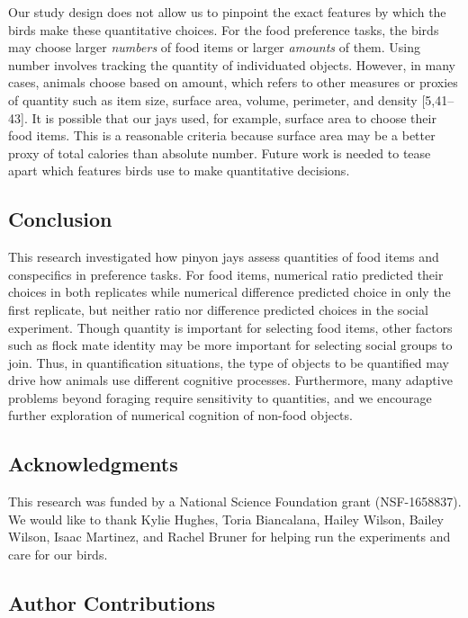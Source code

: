 \documentclass[
  ,pub,floatsintext]{apa6}
\begin{document}
Our study design does not allow us to pinpoint the exact features by which the birds make these quantitative choices. For the food preference tasks, the birds may choose larger \emph{numbers} of food items or larger \emph{amounts} of them. Using number involves tracking the quantity of individuated objects. However, in many cases, animals choose based on amount, which refers to other measures or proxies of quantity such as item size, surface area, volume, perimeter, and density {[}5,41--43{]}. It is possible that our jays used, for example, surface area to choose their food items. This is a reasonable criteria because surface area may be a better proxy of total calories than absolute number. Future work is needed to tease apart which features birds use to make quantitative decisions.

\hypertarget{conclusion}{%
\subsection{Conclusion}\label{conclusion}}

This research investigated how pinyon jays assess quantities of food items and conspecifics in preference tasks. For food items, numerical ratio predicted their choices in both replicates while numerical difference predicted choice in only the first replicate, but neither ratio nor difference predicted choices in the social experiment. Though quantity is important for selecting food items, other factors such as flock mate identity may be more important for selecting social groups to join. Thus, in quantification situations, the type of objects to be quantified may drive how animals use different cognitive processes. Furthermore, many adaptive problems beyond foraging require sensitivity to quantities, and we encourage further exploration of numerical cognition of non-food objects.

\hypertarget{acknowledgments}{%
\subsection{Acknowledgments}\label{acknowledgments}}

This research was funded by a National Science Foundation grant (NSF-1658837). We would like to thank Kylie Hughes, Toria Biancalana, Hailey Wilson, Bailey Wilson, Isaac Martinez, and Rachel Bruner for helping run the experiments and care for our birds.

\hypertarget{author-contributions}{%
\subsection{Author Contributions}\label{author-contributions}}
\end{document}
